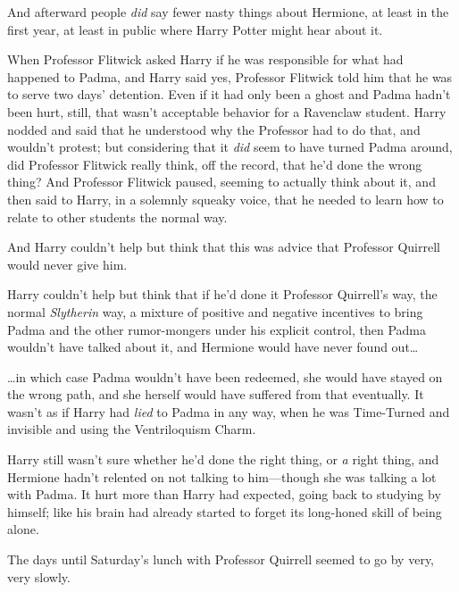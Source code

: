 And afterward people \emph{did} say fewer nasty things about Hermione, at least 
in the first year, at least in public where Harry Potter might hear about it.

When Professor Flitwick asked Harry if he was responsible for what had happened 
to Padma, and Harry said yes, Professor Flitwick told him that he was to serve 
two days' detention. Even if it had only been a ghost and Padma hadn't been 
hurt, still, that wasn't acceptable behavior for a Ravenclaw student. Harry 
nodded and said that he understood why the Professor had to do that, and 
wouldn't protest; but considering that it \emph{did} seem to have turned Padma 
around, did Professor Flitwick really think, off the record, that he'd done the 
wrong thing? And Professor Flitwick paused, seeming to actually think about it, 
and then said to Harry, in a solemnly squeaky voice, that he needed to learn 
how to relate to other students the normal way.

And Harry couldn't help but think that this was advice that Professor Quirrell 
would never give him.

Harry couldn't help but think that if he'd done it Professor Quirrell's way, 
the normal \emph{Slytherin} way, a mixture of positive and negative incentives 
to bring Padma and the other rumor-mongers under his explicit control, then 
Padma wouldn't have talked about it, and Hermione would have never found 
out{\ldots}

{\ldots}in which case Padma wouldn't have been redeemed, she would have stayed 
on the wrong path, and she herself would have suffered from that eventually. It 
wasn't as if Harry had \emph{lied} to Padma in any way, when he was Time-Turned 
and invisible and using the Ventriloquism Charm.

Harry still wasn't sure whether he'd done the right thing, or \emph{a} right 
thing, and Hermione hadn't relented on not talking to him---though she was 
talking a lot with Padma. It hurt more than Harry had expected, going back to 
studying by himself; like his brain had already started to forget its 
long-honed skill of being alone.

The days until Saturday's lunch with Professor Quirrell seemed to go by very, 
very slowly.
